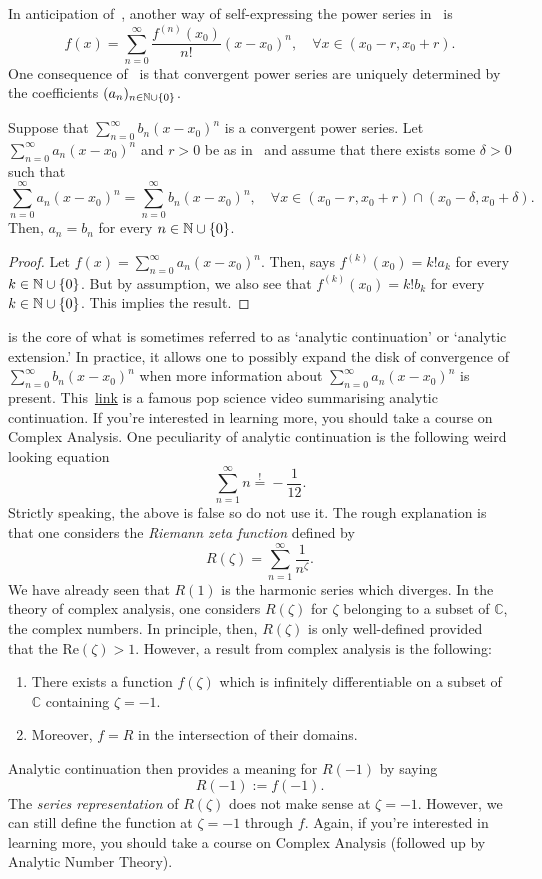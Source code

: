 In anticipation of~, another way of self-expressing the power series in~ is
\[
f(x) = \sum_{n=0}^\infty \frac{f^{(n)}(x_0)}{n!}(x-x_0)^n,\quad \forall x\in(x_0-r,x_0+r).
\]
One consequence of~ is that convergent power series are uniquely determined by the coefficients $(a_n)_{n\in\mathbb{N}\cup\{0\}}$.
\begin{cor}
	\label{cor:uniq_analytic}
	Suppose that $\sum_{n=0}^\infty b_n (x-x_0)^n$ is a convergent power series. Let $\sum_{n=0}^\infty a_n(x-x_0)^n$ and $r>0$ be as in~ and assume that there exists some $\delta>0$ such that
	\[
	\sum_{n=0}^\infty a_n (x-x_0)^n = \sum_{n=0}^\infty b_n (x-x_0)^n,\quad \forall x \in (x_0-r,x_0+r)\cap (x_0-\delta,x_0+\delta).
	\]
	Then, $a_n = b_n$ for every $n\in\mathbb{N}\cup \{0\}$.
\end{cor}
\begin{proof}
	Let $f(x) = \sum_{n=0}^\infty a_n(x-x_0)^n$. Then,  says $f^{(k)}(x_0) = k!a_k$ for every $k\in\mathbb{N}\cup\{0\}$. But by assumption, we also see that $f^{(k)}(x_0) = k!b_k$ for every $k\in\mathbb{N}\cup\{0\}$. This implies the result.
\end{proof}
\begin{rem}
	 is the core of what is sometimes referred to as `analytic continuation' or `analytic extension.' In practice, it allows one to possibly expand the disk of convergence of $\sum_{n=0}^\infty b_n (x-x_0)^n$ when more information about $\sum_{n=0}^\infty a_n (x-x_0)^n$ is present. This~\href{https://www.youtube.com/watch?v=sD0NjbwqlYw&pp=ygUhYW5hbHl0aWMgY29udGludWF0aW9uIDNibHVlMWJyb3du}{link} is a famous pop science video summarising analytic continuation. If you're interested in learning more, you should take a course on Complex Analysis. One peculiarity of analytic continuation is the following weird looking equation
	\[
	\sum_{n=1}^\infty n \overset{!}{=} -\frac{1}{12}.
	\]
	Strictly speaking, the above is false so do not use it. The rough explanation is that one considers the \textit{Riemann zeta function} defined by
	\[
	R(\zeta) = \sum_{n=1}^\infty \frac{1}{n^\zeta}.
	\]
	We have already seen that $R(1)$ is the harmonic series which diverges. In the theory of complex analysis, one considers $R(\zeta)$ for $\zeta$ belonging to a subset of $\mathbb{C}$, the complex numbers. In principle, then, $R(\zeta)$ is only well-defined provided that the Re$(\zeta)>1$. However, a result from complex analysis is the following:
	\begin{enumerate}
		\item There exists a function $f(\zeta)$ which is infinitely differentiable on a subset of $\mathbb{C}$ containing $\zeta = -1$.
		\item Moreover, $f = R$ in the intersection of their domains.
	\end{enumerate}
	Analytic continuation then provides a meaning for $R(-1)$ by saying
	\[
	R(-1) := f(-1).
	\]
	The \textit{series representation} of $R(\zeta)$ does not make sense at $\zeta = -1$. However, we can still define the function at $\zeta = -1$ through $f$. Again, if you're interested in learning more, you should take a course on Complex Analysis (followed up by Analytic Number Theory).
\end{rem}